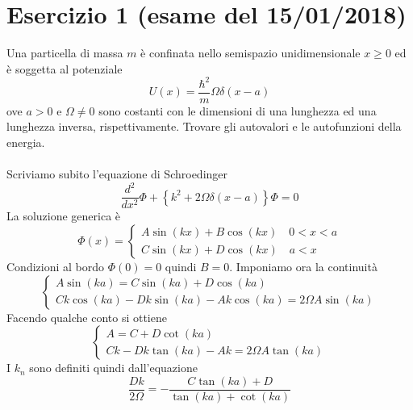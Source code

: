 \documentclass[a4paper]{article}
\begin{document}
    \section*{Esercizio 1 (esame del 15/01/2018)}
        Una particella di massa $m$ è confinata nello semispazio unidimensionale $x\geq0$ ed è soggetta al potenziale
        \begin{equation*}
            U(x)=\frac{\hbar^2}{m}\Omega\delta(x-a)
        \end{equation*}
        ove $a>0$ e $\Omega\neq0$ sono costanti con le dimensioni di una lunghezza ed una lunghezza inversa, rispettivamente. 
        Trovare gli autovalori e le autofunzioni della energia.
        \\
        \\
        Scriviamo subito l'equazione di Schroedinger
        \begin{equation*}
            \frac{d^2}{dx^2}\Phi+\left\{k^2+2\Omega\delta(x-a)\right\}\Phi=0
        \end{equation*}
        La soluzione generica è
        \begin{equation*}
            \Phi(x)=
            \begin{cases}
                A\sin(kx)+B\cos(kx)\quad 0<x<a\\
                C\sin(kx)+D\cos(kx)\quad a<x
            \end{cases}
        \end{equation*}
        Condizioni al bordo $\Phi(0)=0$ quindi $B=0$.
        Imponiamo ora la continuità
        \begin{equation*}
            \begin{cases}
                A\sin(ka)=C\sin(ka)+D\cos(ka)\\
                Ck\cos(ka)-Dk\sin(ka)-Ak\cos(ka)=2\Omega A\sin(ka)
            \end{cases}
        \end{equation*}
        Facendo qualche conto si ottiene
        \begin{equation*}
            \begin{cases}
                A=C+D\cot(ka)\\
                Ck-Dk\tan(ka)-Ak=2\Omega A\tan(ka)
            \end{cases}
        \end{equation*}
        I $k_n$ sono definiti quindi dall'equazione
        \begin{equation*}
            \frac{Dk}{2\Omega}=-\frac{C\tan(ka)+D}{\tan(ka)+\cot(ka)}
        \end{equation*}
\end{document}
